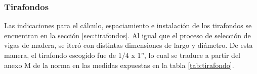\subsubsection{Tirafondos}
Las indicaciones para el cálculo, espaciamiento e instalación de los tirafondos se encuentran en la sección \ref{sec:tirafondos}. Al igual que el proceso de selección de vigas de madera, se iteró con distintas dimensiones de largo y diámetro. De esta manera, el tirafondo escogido fue de $1/4$ x 1'', lo cual se traduce a partir del anexo M de la norma en las medidas expuestas en la tabla \ref{tab:tirafondo}.
\begin{table}[h]
\centering
{}
\caption{Dimensiones del tirafondo utilizado}
\label{tab:tirafondo}
\end{table}

